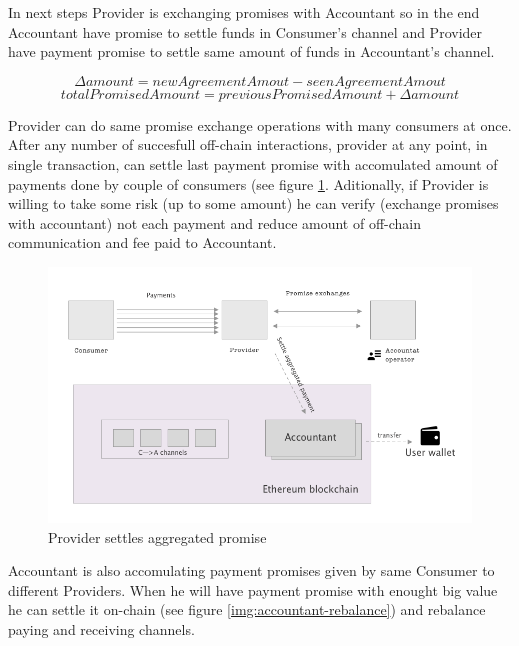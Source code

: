 \documentclass[a4paper,12pt]{article}
\begin{document}
In next steps Provider is exchanging promises with Accountant so in the end 
Accountant have promise to settle funds in Consumer's channel and Provider 
have payment promise to settle same amount of funds in Accountant's channel.

\[ \Delta amount = newAgreementAmout - seenAgreementAmout \]
\[ totalPromisedAmount = previousPromisedAmount + \Delta amount \]

Provider can do same promise exchange operations with many consumers at once. 
After any number of succesfull off-chain interactions, provider at any point, 
in single transaction, can settle last payment promise with accomulated amount 
of payments done by couple of consumers (see figure \ref{img:payment}. 
Aditionally, if Provider is willing to take some risk (up to some amount) he 
can verify (exchange promises with accountant) not each payment and reduce 
amount of off-chain communication and fee paid to Accountant.

\begin{figure}[H]
    \centering
    \includegraphics[scale=0.4]{img/payment}
    \caption{Provider settles aggregated promise}
    \label{img:payment}
\end{figure}

Accountant is also accomulating payment promises given by same Consumer to 
different Providers. When he will have payment promise with enought big value 
he can settle it on-chain (see figure \ref{img:accountant-rebalance}) and 
rebalance paying and receiving channels.
\end{document}

